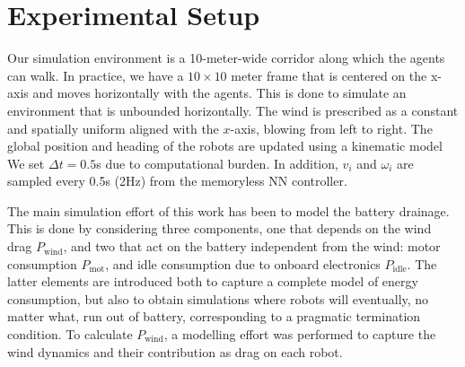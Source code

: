 \section{Experimental Setup}
\label{sec:EXp_Setup}

Our simulation environment is a 10-meter-wide corridor along which the agents can walk. In practice, we have a $10 \times 10$ meter frame that is centered on the x-axis and moves horizontally with the agents. This is done to simulate an environment that is unbounded horizontally.  The wind is prescribed as a constant and spatially uniform aligned with the $x$-axis, blowing from left to right. The global position and heading of the robots are updated using a kinematic model We set $\Delta t = 0.5$s due to computational burden. In addition, $v_i$ and $\omega_i$ are sampled every 0.5s (2Hz) from the memoryless NN controller.

The main simulation effort of this work has been to model the battery drainage. This is done by considering three components, one that depends on the wind drag $P_\text{wind}$, and two that act on the battery independent from the wind: motor consumption $P_\text{mot}$, and idle consumption due to onboard electronics $P_\text{idle}$. The latter elements are introduced both to capture a complete model of energy consumption, but also to obtain simulations where robots will eventually, no matter what, run out of battery, corresponding to a pragmatic termination condition. To calculate $P_\text{wind}$, a modelling effort was performed to capture the wind dynamics and their contribution as drag on each robot.

